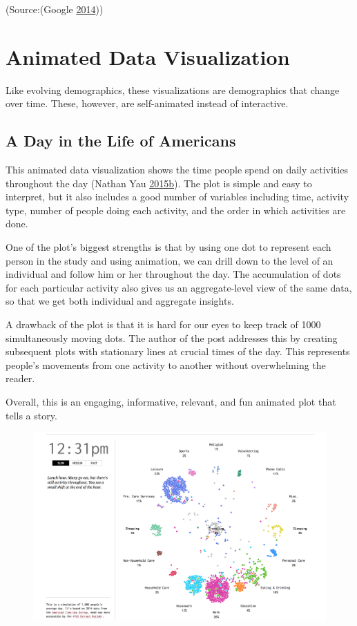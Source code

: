 \documentclass[]{book}
\theoremstyle{definition}
\theoremstyle{definition}
\theoremstyle{definition}
\theoremstyle{remark}
\begin{document}
(Source:(Google \protect\hyperlink{ref-google_music}{2014}))

\section{Animated Data Visualization}\label{animated-data-visualization}

Like evolving demographics, these visualizations are demographics that
change over time. These, however, are self-animated instead of
interactive.

\subsection{A Day in the Life of
Americans}\label{a-day-in-the-life-of-americans}

This animated data visualization shows the time people spend on daily
activities throughout the day (Nathan Yau
\protect\hyperlink{ref-American_life}{2015}\protect\hyperlink{ref-American_life}{b}).
The plot is simple and easy to interpret, but it also includes a good
number of variables including time, activity type, number of people
doing each activity, and the order in which activities are done.

One of the plot's biggest strengths is that by using one dot to
represent each person in the study and using animation, we can drill
down to the level of an individual and follow him or her throughout the
day. The accumulation of dots for each particular activity also gives us
an aggregate-level view of the same data, so that we get both individual
and aggregate insights.

A drawback of the plot is that it is hard for our eyes to keep track of
1000 simultaneously moving dots. The author of the post addresses this
by creating subsequent plots with stationary lines at crucial times of
the day. This represents people's movements from one activity to another
without overwhelming the reader.

Overall, this is an engaging, informative, relevant, and fun animated
plot that tells a story.

\begin{figure}
\centering
\includegraphics{images/life_of_americans.png}
\caption{}
\end{figure}
\end{document}

